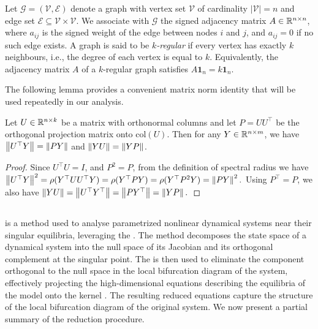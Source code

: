 \documentclass[letterpaper, 10 pt, conference]{ieeeconf}
\begin{document}
Let \(\mathcal{G} = (\mathcal{V}, \mathcal{E})\) denote a graph with vertex set \(\mathcal{V}\) of cardinality \(|\mathcal{V}| = n\) and edge set \(\mathcal{E} \subseteq \mathcal{V} \times \mathcal{V}\).
We associate with \(\mathcal{G}\) the signed adjacency matrix \(A \in \R[n \times n]\), where \(a_{ij}\) is the signed weight of the edge between nodes \(i\) and \(j\), and \(a_{ij} = 0\) if no such edge exists.
A graph is said to be \emph{\(k\)-regular} if every vertex has exactly \(k\) neighbours, i.e., the degree of each vertex is equal to \(k\). Equivalently, the adjacency matrix \(A\) of a \(k\)-regular graph satisfies \(A \mathbf{1}_{n} = k \mathbf{1}_{n}\).

\vspace{2mm}

The following lemma provides a convenient matrix norm identity that will be used repeatedly in our analysis.
\begin{lemma}\label{lem:P-norm}
    Let \(U \in \R[n \times k]\) be a matrix with orthonormal columns and let \(P = U U^{\top}\) be the orthogonal projection matrix onto \(\mathrm{col}(U)\). Then for any \(Y \in \R[n \times m]\), we have \(\norm{U^{\top} Y} = \norm{P Y}\) and \(\norm{Y U} = \norm{Y P}\).
\end{lemma}
\begin{proof}
    Since \(U^{\top}U = I\), and \(P^2=P\), from the definition of spectral radius we have
    \(
    \norm{U^{\top}Y}^2 = \rho(Y^{\top}UU^{\top}Y)
    = \rho(Y^{\top}PY)
    = \rho(Y^{\top}P^2Y)
    = \norm{PY}^2.
    \)
    Using \(P^{\top}=P\), we also have
    \(
    \norm{YU} = \norm{U^{\top}Y^{\top}}
    = \norm{PY^{\top}}
    = \norm{YP}.
    \)
\end{proof}


\subsection{\LSR{}}
\label{subsec:LSR}

\LSR{} is a method used to analyse parametrized nonlinear dynamical systems near their singular equilibria, leveraging the \ImFT{}. The method decomposes the state space of a dynamical system into the null space of its Jacobian and its orthogonal complement at the singular point. The \ImFT{} is then used to eliminate the component orthogonal to the null space in the local bifurcation diagram of the system, effectively projecting the high-dimensional equations describing the equilibria of the model onto the kernel \cite[Ch. VII]{Golubitsky1985}. The resulting reduced equations capture the structure of the local bifurcation diagram of the original system. We now present a partial summary of the reduction procedure.
\end{document}
